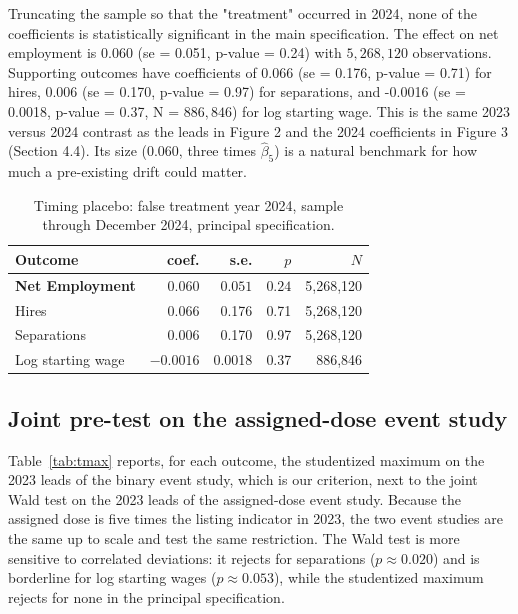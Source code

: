 \documentclass[12pt,a4paper]{article}
\begin{document}
Truncating the sample so that the "treatment" occurred in 2024, none of the coefficients is statistically significant in the main specification. The effect on net employment is 0.060 (se = 0.051, p-value = 0.24) with $5{,}268{,}120$ observations. Supporting outcomes have coefficients of 0.066 (se = 0.176, p-value = 0.71) for hires, 0.006 (se = 0.170, p-value = 0.97) for separations, and -0.0016 (se = 0.0018, p-value = 0.37, N = $886{,}846$) for log starting wage. This is the same 2023 versus 2024 contrast as the leads in Figure 2 and the 2024 coefficients in Figure 3 (Section 4.4). Its size (0.060, three times $\hat\beta_5$) is a natural benchmark for how much a pre-existing drift could matter.

\begin{table}[H]
\centering
\caption{Timing placebo: false treatment year 2024, sample through December 2024, principal specification.}
\label{tab:placebo2024}
\begin{tabular}{lrrrr}
\toprule
Outcome & coef. & s.e. & $p$ & $N$ \\
\midrule
\textbf{Net Employment} & $\mathbf{0.060}$ & $\mathbf{0.051}$ & $\mathbf{0.24}$ & 5{,}268{,}120 \\
Hires & 0.066 & 0.176 & 0.71 & 5{,}268{,}120 \\
Separations & 0.006 & 0.170 & 0.97 & 5{,}268{,}120 \\
Log starting wage & $-0.0016$ & 0.0018 & 0.37 & 886{,}846 \\
\bottomrule
\end{tabular}
\end{table}

\subsection{Joint pre-test on the assigned-dose event study}

Table~\ref{tab:tmax} reports, for each outcome, the studentized maximum on the 2023 leads of the binary event study, which is our criterion, next to the joint Wald test on the 2023 leads of the assigned-dose event study. Because the assigned dose is five times the listing indicator in 2023, the two event studies are the same up to scale and test the same restriction. The Wald test is more sensitive to correlated deviations: it rejects for separations ($p\approx0.020$) and is borderline for log starting wages ($p\approx0.053$), while the studentized maximum rejects for none in the principal specification.
\end{document}
